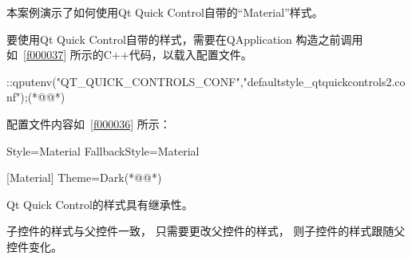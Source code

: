 本案例演示了如何使用Qt Quick Control自带的“Material”样式。

要使用Qt Quick Control自带的样式，需要在QApplication
构造之前调用如\filesourcenumbernameone\ \ref{f000037}
所示的C{\sourcefonttwo{}+}{\sourcefonttwo{}+}代码，以载入配置文件。

\label{f000037}    %
\FloatBarrier                                  %
\begin{thebookfilesourceone}[escapeinside={(*@}{@*)},
caption=GoodLuck,
title=\filesourcenumbernameone \thefilesourcenumber
]
::qputenv("QT_QUICK_CONTROLS_CONF","defaultstyle_qtquickcontrols2.conf");(*@\marginpar[\hfill\setlength\fboxsep{2pt}\fbox{\footnotesize{\kaishu\parbox{1em}{\setlength{\baselineskip}{2pt}\filesourcenumbernameone}}\footnotesize{\thefilesourcenumber}}]{\setlength\fboxsep{2pt}\fbox{\footnotesize{\kaishu\parbox{1em}{\setlength{\baselineskip}{2pt}\filesourcenumbernameone}}\footnotesize{\thefilesourcenumber}}}@*)\end{thebookfilesourceone}          %
\addtocounter{lstlisting}{-1}   %


配置文件内容如\filesourcenumbernameone\ \ref{f000036}
所示：
\label{f000036}    %
\FloatBarrier                                  %
\begin{thebookfilesourceone}[escapeinside={(*@}{@*)},
caption=GoodLuck,
title=\filesourcenumbernameone \thefilesourcenumber
]
[Controls]
Style=Material
FallbackStyle=Material

[Material]
Theme=Dark(*@\marginpar[\hfill\setlength\fboxsep{2pt}\fbox{\footnotesize{\kaishu\parbox{1em}{\setlength{\baselineskip}{2pt}\filesourcenumbernameone}}\footnotesize{\thefilesourcenumber}}]{\setlength\fboxsep{2pt}\fbox{\footnotesize{\kaishu\parbox{1em}{\setlength{\baselineskip}{2pt}\filesourcenumbernameone}}\footnotesize{\thefilesourcenumber}}}@*)\end{thebookfilesourceone}          %
\addtocounter{lstlisting}{-1}   %

Qt Quick Control的样式具有继承性。

子控件的样式与父控件一致，
只需要更改父控件的样式，
则子控件的样式跟随父控件变化。


